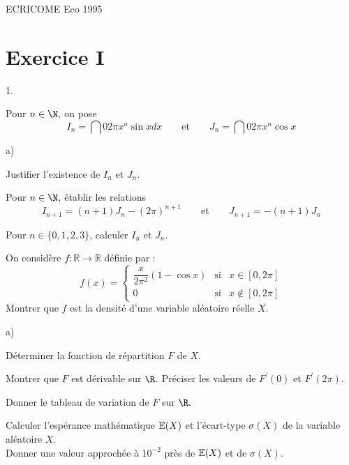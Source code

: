 \documentclass[11pt]{article}%
\begin{document}
\begin{center}
{\Huge ECRICOME Eco 1995}
\end{center}

\section*{Exercice I}

\begin{noliste}{1.}
 \setlength{\itemsep}{4mm}
\item Pour $n\in \N,$ on pose 
\[
I_{n} = \dint{0}{2\pi }x^{n}\sin xdx\qquad \text{et}\qquad
J_{n} = \dint{0}{2\pi }x^{n}\cos x
\]

\begin{noliste}{a)}
 \setlength{\itemsep}{2mm}
\item Justifier l'existence de $I_{n}$ et $J_{n}.$

\item Pour $n\in \N,$ établir les relations 
\[
I_{n + 1} = (n + 1)J_{n}-(2\pi )^{n + 1}\qquad \text{et}\qquad J_{n +
1} = -(n + 1)J_{n}
\]

\item Pour $n\in \{0,1,2,3\}$, calculer $I_{n}$ et $J_{n}.$
\end{noliste}

\item On considère $f :\mathbb{R\rightarrow R}$ définie par : 
\[
f(x) = \left\{ 
\begin{array}{ccc}
\dfrac{x}{2\pi ^{2}}(1-\cos x) & \text{si} & x\in [0,2\pi ] \\
0 & \text{si} & x\notin [0,2\pi ]
\end{array}
\right.
\]
Montrer que $f$ est la densité d'une variable aléatoire réelle $X.$

\item 

\begin{noliste}{a)}
 \setlength{\itemsep}{2mm}
\item Déterminer la fonction de répartition $F$ de $X.$

\item Montrer que $F$ est dérivable sur $\R.$ Préciser les valeurs
de $F^{\prime }(0)$ et $F^{\prime }(2\pi ).$

\item Donner le tableau de variation de $F$ sur $\R.$
\end{noliste}

\item Calculer l'espérance mathématique $\mathbb{E}(X)$ et l'écart-type $\sigma
(X)$
de la variable aléatoire $X.$\\
Donner une valeur approchée à $10^{-2}$ près de $\mathbb{E}(X)$ et de $\sigma
(X).$


\end{noliste}
\end{document}

